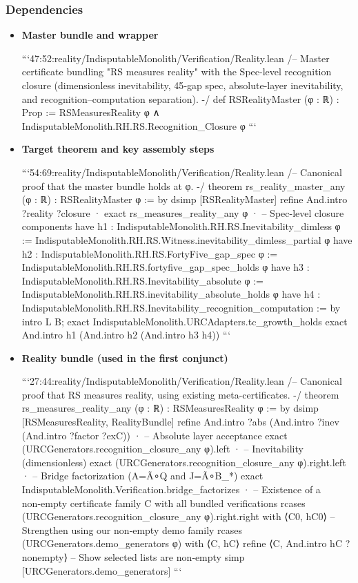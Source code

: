 \documentclass{article}
\begin{document}
\subsubsection{Dependencies}
\begin{itemize}[leftmargin=*]
  \item \textbf{Master bundle and wrapper}

```47:52:reality/IndisputableMonolith/Verification/Reality.lean
/-- Master certificate bundling "RS measures reality" with the Spec-level
    recognition closure (dimensionless inevitability, 45‑gap spec, absolute-layer
    inevitability, and recognition–computation separation). -/
 def RSRealityMaster (φ : ℝ) : Prop :=
  RSMeasuresReality φ ∧ IndisputableMonolith.RH.RS.Recognition_Closure φ
```

  \item \textbf{Target theorem and key assembly steps}

```54:69:reality/IndisputableMonolith/Verification/Reality.lean
/-- Canonical proof that the master bundle holds at φ. -/
 theorem rs_reality_master_any (φ : ℝ) : RSRealityMaster φ := by
  dsimp [RSRealityMaster]
  refine And.intro ?reality ?closure
  · exact rs_measures_reality_any φ
  ·
    -- Spec-level closure components
    have h1 : IndisputableMonolith.RH.RS.Inevitability_dimless φ :=
      IndisputableMonolith.RH.RS.Witness.inevitability_dimless_partial φ
    have h2 : IndisputableMonolith.RH.RS.FortyFive_gap_spec φ :=
      IndisputableMonolith.RH.RS.fortyfive_gap_spec_holds φ
    have h3 : IndisputableMonolith.RH.RS.Inevitability_absolute φ :=
      IndisputableMonolith.RH.RS.inevitability_absolute_holds φ
    have h4 : IndisputableMonolith.RH.RS.Inevitability_recognition_computation := by
      intro L B; exact IndisputableMonolith.URCAdapters.tc_growth_holds
    exact And.intro h1 (And.intro h2 (And.intro h3 h4))
```

  \item \textbf{Reality bundle (used in the first conjunct)}

```27:44:reality/IndisputableMonolith/Verification/Reality.lean
/-- Canonical proof that RS measures reality, using existing meta-certificates. -/
 theorem rs_measures_reality_any (φ : ℝ) : RSMeasuresReality φ := by
  dsimp [RSMeasuresReality, RealityBundle]
  refine And.intro ?abs (And.intro ?inev (And.intro ?factor ?exC))
  · -- Absolute layer acceptance
    exact (URCGenerators.recognition_closure_any φ).left
  · -- Inevitability (dimensionless)
    exact (URCGenerators.recognition_closure_any φ).right.left
  · -- Bridge factorization (A=Ã∘Q and J=Ã∘B_*)
    exact IndisputableMonolith.Verification.bridge_factorizes
  · -- Existence of a non‑empty certificate family C with all bundled verifications
    rcases (URCGenerators.recognition_closure_any φ).right.right with ⟨C0, hC0⟩
    -- Strengthen using our non‑empty demo family
    rcases (URCGenerators.demo_generators φ) with ⟨C, hC⟩
    refine ⟨C, And.intro hC ?nonempty⟩
    -- Show selected lists are non‑empty
    simp [URCGenerators.demo_generators]
```
\end{itemize}
\end{document}
